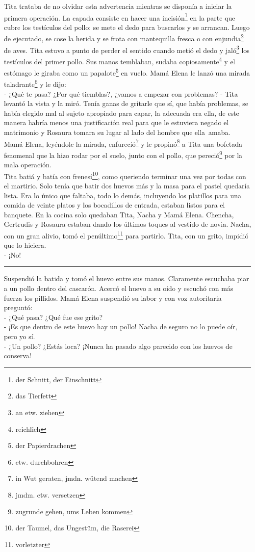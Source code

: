 Tita trataba de no olvidar esta advertencia mientras se disponía a
iniciar la primera operación. La capada consiste en hacer una incisión\footnote{der Schnitt, der Einschnitt}
en la parte que cubre los testículos del pollo: se mete el dedo para
buscarlos y se arrancan. Luego de ejecutado, se cose la herida y se
frota con mantequilla fresca o con enjundia\footnote{das Tierfett}
de aves. Tita estuvo a punto de perder el sentido cuando metió el dedo
y jaló\footnote{an etw. ziehen} los testículos
del primer pollo. Sus manos temblaban, sudaba copiosamente\footnote{reichlich}
y el estómago le giraba como un papalote\footnote{der Papierdrachen}
en vuelo. Mamá Elena le lanzó una mirada taladrante\footnote{etw. durchbohren}
y le dijo:
\\- ¿Qué te pasa? ¿Por qué tiemblas?, ¿vamos a empezar con problemas? - Tita %
levantó la vista y la miró. Tenía ganas de gritarle que sí, que %
había problemas, se había elegido mal al sujeto apropiado para capar, la %
adecuada era ella, de este manera habría menos una justificación real %
para que le estuviera negado el matrimonio y Rosaura tomara su lugar al %
lado del hombre que ella~amaba. Mamá Elena, leyéndole la mirada, enfureció\footnote{in Wut geraten, jmdn. wütend machen} %
y le propinó\footnote{jmdm. etw. versetzen} a %
Tita una bofetada fenomenal que la hizo rodar por el suelo, junto con el pollo, %
que pereció\footnote{zugrunde gehen, ums Leben kommen} por la mala operación.\\

Tita batiá y batía con frenesí\footnote{der Taumel, das Ungestüm, die Raserei},
como queriendo terminar una vez por todas con el martirio. Solo tenía que
batir dos huevos más y la masa para el pastel quedaría lista. Era lo único
que faltaba, todo lo demás, incluyendo los platillos para una comida de veinte
platos y los bocadillos de entrada, estaban listos para el banquete. En la
cocina solo quedaban Tita, Nacha y Mamá Elena. Chencha, Gertrudis y Rosaura
estaban dando los últimos toques al vestido de novia. Nacha, con un gran
alivio, tomó el penúltimo\footnote{vorletzter} para partirlo.
Tita, con un grito, impidió que lo hiciera.
\\- ¡No! \\
\rule{1em}{0pt}Suspendió la batida y tomó el huevo entre sus manos. Claramente
escuchaba piar a un pollo dentro del cascarón. Acercó el huevo a su oído
y escuchó con más fuerza los pillidos. Mamá Elena suspendió su labor y
con voz autoritaria preguntó:
\\- ¿Qué pasa? ¿Qué fue ese grito? %
\\- ¡Es que dentro de este huevo hay un pollo! Nacha de seguro no lo puede %
oír, pero yo sí. %
\\- ¿Un pollo? ¿Estás loca? ¡Nunca ha pasado algo parecido con los huevos %
de conserva!\\

